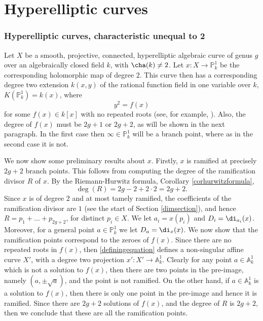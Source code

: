 \chapter{Hyperelliptic curves} \label{chapterhyperellipticcurves}

\subsection{Hyperelliptic curves, characteristic unequal to 2}\label{charneq2}
Let $X$ be a smooth, projective, connected, hyperelliptic algebraic curve of genus $g$ over an algebraically closed field $k$, with $\cha (k) \neq 2$.
Let $x:X\rightarrow \mathbb{P}_k^1$ be the corresponding holomorphic map of degree $2$.
This curve then has a corresponding degree two extension $k(x,y)$ of the rational function field in one variable over $k$, $K(\mathbb P_k^1) = k(x)$, where
   \begin{equation}\label{definingequation}
   y^2 = f(x)
   \end{equation}
for some $f(x)\in k[x]$ with no repeated roots (see, for example, \cite[Rem. 7.4.25]{liu}).
Also, the degree of $f(x)$ must be $2g+1$ or $2g+2$, as will be shown in the next paragraph.
In the first case then $\infty \in \mathbb P_k^1$ will be a branch point, where as in the second case it is not.

We now show some preliminary results about $x$. 
Firstly, $x$ is ramified at precisely $2g + 2$ branch points.
This follows from computing the degree of the ramification divisor $R$ of $x$.
By the Riemann-Hurwitz formula, Corollary \ref{corhurwitzformula},
    \[ 
    \deg(R) = 2g -2 +2\cdot 2 = 2g + 2.
    \]
Since $x$ is of degree $2$ and at most tamely ramified, the coefficients of the ramification divisor are $1$ (see the start of Section \ref{dimsection}), and hence $R = p_1 + \ldots + p_{2g+2}$, for distinct $p_i\in X$.
We let $a_i = x(p_i)$ and $D_i = \di_{a_i}(x)$.
Moreover, for a general point $a \in \mathbb P_k^1$ we let $D_a = \di_x(x)$.
We now show that the ramification points correspond to the zeroes of $f(x)$.
Since there are no repeated roots in $f(x)$, then \eqref{definingequation} defines a non-singular affine curve $X'$, with a degree two projection $x': X'\rightarrow \mathbb A_k^1$.
Clearly for any point $a\in \mathbb A_k^1$ which is not a solution to $f(x)$, then there are two points in the pre-image, namely $(a,\pm \sqrt{a})$, and the point is not ramified.
On the other hand, if $a\in \mathbb A_k^1$ is a solution to $f(x)$, then there is only one point in the pre-image and hence it is ramified.
Since there are $2g+2$ solutions of $f(x)$, and the degree of $R$ is $2g+2$, then we conclude that these are all the ramification points.


